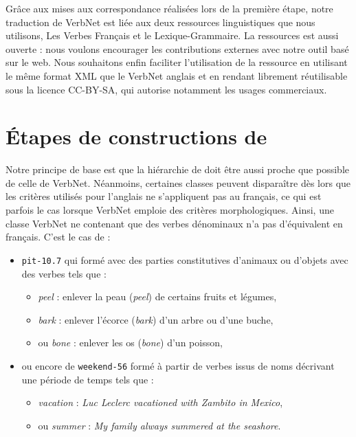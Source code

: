 Grâce aux mises aux correspondance réalisées lors de la première étape, notre
traduction de VerbNet est liée aux deux ressources linguistiques que nous
utilisons, Les Verbes Français et le Lexique-Grammaire. La ressources est aussi
ouverte : nous voulons encourager les contributions externes avec notre outil
basé sur le web. Nous souhaitons enfin faciliter l'utilisation de la ressource
en utilisant le même format XML que le VerbNet anglais et en rendant
\verbenet{} librement réutilisable sous la licence CC-BY-SA, qui autorise
notamment les usages commerciaux.

\section{Étapes de constructions de \verbenet{}}

Notre principe de base est que la hiérarchie de \verbenet{} doit être aussi
proche que possible de celle de VerbNet.  Néanmoins, certaines classes peuvent
disparaître dès lors que les critères utilisés pour l'anglais ne s'appliquent
pas au français, ce qui est parfois le cas lorsque VerbNet emploie des critères
morphologiques. Ainsi, une classe VerbNet ne contenant que des verbes
dénominaux n'a pas d'équivalent en français. C'est le cas de :

\begin{itemize}
    \item {\color{blue}\texttt{pit-10.7}} qui formé avec des parties
        constitutives d'animaux ou d'objets avec des verbes tels que :
        \begin{itemize}
            \item \textit{peel} : enlever la peau (\textit{peel}) de certains fruits
                et légumes,
            \item \textit{bark} : enlever l'écorce (\textit{bark}) d'un arbre ou
                d'une buche,
            \item ou \textit{bone} : enlever les os (\textit{bone}) d'un poisson,
        \end{itemize}
    \item ou encore de {\color{blue}\texttt{weekend-56}} formé à partir de
        verbes issus de noms décrivant une période de temps tels que :
        \begin{itemize}
            \item \textit{vacation} : \textit{Luc Leclerc vacationed with Zambito in
                Mexico},
            \item ou \textit{summer} : \textit{My family always summered at the seashore}.
        \end{itemize}
\end{itemize}

